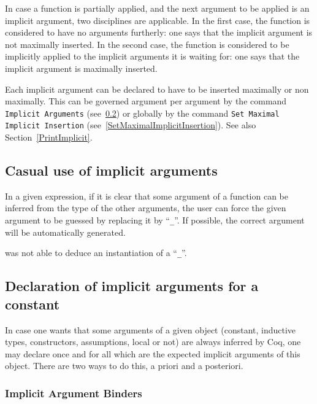 In case a function is partially applied, and the next argument to be
applied is an implicit argument, two disciplines are applicable. In the
first case, the function is considered to have no arguments furtherly:
one says that the implicit argument is not maximally inserted. In
the second case, the function is considered to be implicitly applied
to the implicit arguments it is waiting for: one says that the
implicit argument is maximally inserted.

Each implicit argument can be declared to have to be inserted
maximally or non maximally. This can be governed argument per argument
by the command {\tt Implicit Arguments} (see~\ref{ImplicitArguments})
or globally by the command {\tt Set Maximal Implicit Insertion}
(see~\ref{SetMaximalImplicitInsertion}). See also
Section~\ref{PrintImplicit}.

\subsection{Casual use of implicit arguments}

In a given expression, if it is clear that some argument of a function
can be inferred from the type of the other arguments, the user can
force the given argument to be guessed by replacing it by ``{\tt \_}''. If
possible, the correct argument will be automatically generated.

\begin{ErrMsgs}

\item {}

  {\Coq} was not able to deduce an instantiation of a ``{\tt \_}''.

\end{ErrMsgs}

\subsection{Declaration of implicit arguments for a constant
}
\label{ImplicitArguments}

In case one wants that some arguments of a given object (constant,
inductive types, constructors, assumptions, local or not) are always
inferred by Coq, one may declare once and for all which are the expected
implicit arguments of this object. There are two ways to do this,
a priori and a posteriori.

\subsubsection{Implicit Argument Binders}


